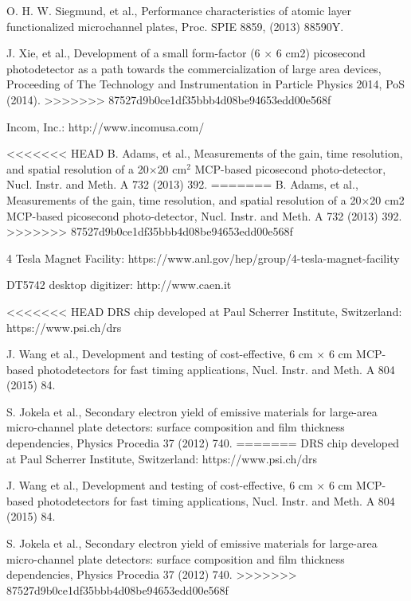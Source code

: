 ﻿\documentclass[preprint,5p]{elsarticle}
\begin{document}
\begin{thebibliography}{00}
O. H. W. Siegmund, et al., Performance characteristics of atomic layer functionalized microchannel plates, Proc. SPIE 8859, (2013) 88590Y.

J. Xie, et al., Development of a small form-factor (6 × 6 cm2) picosecond photodetector as a path towards the commercialization of large area devices, Proceeding of The Technology and Instrumentation in Particle Physics 2014, PoS (2014).
>>>>>>> 87527d9b0ce1df35bbb4d08be94653edd00e568f

Incom, Inc.: http://www.incomusa.com/

<<<<<<< HEAD
B. Adams, et al., Measurements of the gain, time resolution, and spatial 
resolution of a 20$\times$20 cm$^2$ MCP-based picosecond photo-detector, Nucl.  
Instr.  and Meth. A 732 (2013) 392.
=======
B. Adams, et al., Measurements of the gain, time resolution, and spatial resolution of a 20×20 cm2 MCP-based picosecond photo-detector, Nucl. Instr. and Meth. A 732 (2013) 392.
>>>>>>> 87527d9b0ce1df35bbb4d08be94653edd00e568f

4 Tesla Magnet Facility: https://www.anl.gov/hep/group/4-tesla-magnet-facility 

DT5742 desktop digitizer: http://www.caen.it

<<<<<<< HEAD
DRS chip developed at Paul Scherrer Institute, Switzerland: 
https://www.psi.ch/drs

J. Wang et al., Development and testing of cost-effective, 6 cm × 6 cm 
MCP-based photodetectors for fast timing applications, Nucl. Instr. and Meth. A 
804 (2015) 84.

S. Jokela et al., Secondary electron yield of emissive materials for large-area 
micro-channel plate detectors: surface composition and film thickness 
dependencies, Physics Procedia 37 (2012) 740.
=======
DRS chip developed at Paul Scherrer Institute, Switzerland: https://www.psi.ch/drs

J. Wang et al., Development and testing of cost-effective, 6 cm × 6 cm MCP-based photodetectors for fast timing applications, Nucl. Instr. and Meth. A 804 (2015) 84.

S. Jokela et al., Secondary electron yield of emissive materials for large-area micro-channel plate detectors: surface composition and film thickness dependencies, Physics Procedia 37 (2012) 740.
>>>>>>> 87527d9b0ce1df35bbb4d08be94653edd00e568f


\end{thebibliography}
\end{document}

